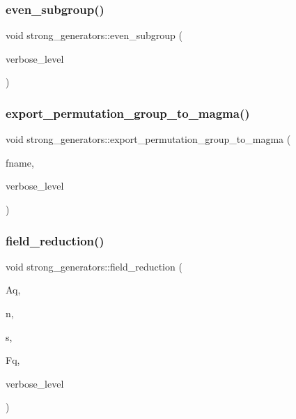 \subsubsection{\texorpdfstring{even\+\_\+subgroup()}{even\_subgroup()}}
{\footnotesize\ttfamily void strong\+\_\+generators\+::even\+\_\+subgroup (\begin{DoxyParamCaption}\item[{\mbox{\hyperlink{galois_8h_a09fddde158a3a20bd2dcadb609de11dc}{I\+NT}}}]{verbose\+\_\+level }\end{DoxyParamCaption})}

\mbox{\label{classstrong__generators_ad3bc816d85d318aabb02c40862bceb27}} 
\subsubsection{\texorpdfstring{export\+\_\+permutation\+\_\+group\+\_\+to\+\_\+magma()}{export\_permutation\_group\_to\_magma()}}
{\footnotesize\ttfamily void strong\+\_\+generators\+::export\+\_\+permutation\+\_\+group\+\_\+to\+\_\+magma (\begin{DoxyParamCaption}\item[{const \mbox{\hyperlink{galois_8h_ab6cc7b4aeb6ea31aba2b3fbfc83ff5e6}{B\+Y\+TE}} $\ast$}]{fname,  }\item[{\mbox{\hyperlink{galois_8h_a09fddde158a3a20bd2dcadb609de11dc}{I\+NT}}}]{verbose\+\_\+level }\end{DoxyParamCaption})}

\mbox{\label{classstrong__generators_a1be4403b37e1f5821578d8015a9c60ae}} 
\subsubsection{\texorpdfstring{field\+\_\+reduction()}{field\_reduction()}}
{\footnotesize\ttfamily void strong\+\_\+generators\+::field\+\_\+reduction (\begin{DoxyParamCaption}\item[{\mbox{\hyperlink{classaction}{action}} $\ast$}]{Aq,  }\item[{\mbox{\hyperlink{galois_8h_a09fddde158a3a20bd2dcadb609de11dc}{I\+NT}}}]{n,  }\item[{\mbox{\hyperlink{galois_8h_a09fddde158a3a20bd2dcadb609de11dc}{I\+NT}}}]{s,  }\item[{\mbox{\hyperlink{classfinite__field}{finite\+\_\+field}} $\ast$}]{Fq,  }\item[{\mbox{\hyperlink{galois_8h_a09fddde158a3a20bd2dcadb609de11dc}{I\+NT}}}]{verbose\+\_\+level }\end{DoxyParamCaption})}

